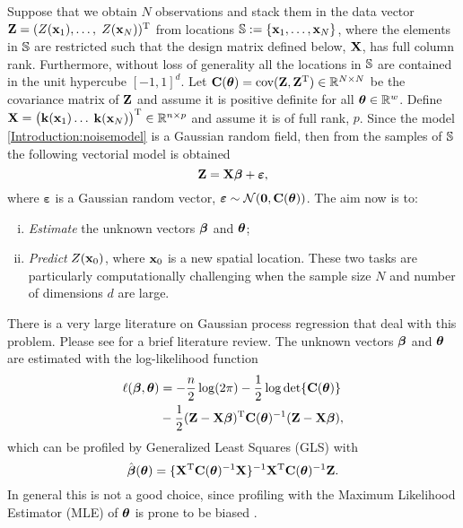 \documentclass[11pt,final]{amsart}       %
\begin{document}
Suppose that we obtain $N$ observations and stack them in the data
vector $\mathbf{Z}=(Z(\mathbf{x}_1),\ldots,$ $Z(\mathbf{x}_N))^{\rm T}$ from locations $\mathbb{S} :=\{
\mathbf{x}_{1},\dots,\mathbf{x}_{N}\}$, where the elements in $\mathbb{S}$ are restricted
such that the design matrix defined below, $\mathbf{X}$, has full column
rank.  Furthermore, without loss of generality all the locations in
$\mathbb{S}$ are contained in the unit hypercube $[-1,1]^{d}$.  Let
$\mathbf{C}(\boldsymbol{\theta})=\hbox{cov}(\mathbf{Z},\mathbf{Z}^{\rm T})\in \Bbb{R}^{N \times N}$ be the covariance
matrix of $\mathbf{Z}$ and assume it is positive definite for all
$\boldsymbol{\theta}\in\Bbb{R}^w$.  Define $\mathbf{X}=\big( \mathbf{k}(\mathbf{x}_1) \ldots$ $
\mathbf{k}(\mathbf{x}_N)\big)^{\rm T}\in \Bbb{R}^{n\times p}$ and assume it is of full rank,
$p$. Since the model \eqref{Introduction:noisemodel} is a Gaussian
random field, then from the samples of $\mathbb{S}$ the following vectorial
model is obtained
\begin{equation}
{\bf Z} = \mathbf{X} \boldsymbol{\beta} +{\boldsymbol \varepsilon},
\label{Introduction:vectormodel}
\end{equation}
where $\boldsymbol \varepsilon$ is a Gaussian random vector,
${\boldsymbol \varepsilon} \sim {\mathcal N}(\mathbf{0},\mathbf{C}(\boldsymbol{\theta}))$. The aim
now is to:

\begin{enumerate}[i)]
\item {\it Estimate} the unknown vectors $\boldsymbol{\beta}$ and $\boldsymbol{\theta}$;

\item {\it Predict} $Z(\mathbf{x}_0)$, where $\mathbf{x}_0$ is a new spatial
  location. These two tasks are particularly computationally
  challenging when the sample size $N$ and number of dimensions $d$
  are large.
\end{enumerate}

There is a very large literature on Gaussian process regression that
deal with this problem. Please see \cite{Castrillon2015} for a brief
literature review.  The unknown vectors $\boldsymbol{\beta}$ and $\boldsymbol{\theta}$ are
estimated with the log-likelihood function
\begin{equation}
  \begin{split}
\ell(\boldsymbol{\beta},\boldsymbol{\theta})&=-\frac{n}{2}\log(2\pi)-\frac{1}{2}\log
\det\{\mathbf{C}(\boldsymbol{\theta})\} \\ &
-\frac{1}{2}(\mathbf{Z}-\mathbf{X}\boldsymbol{\beta})^{\rm T}\mathbf{C}(\boldsymbol{\theta})^{-1}
(\mathbf{Z}-\mathbf{X}\boldsymbol{\beta}),
\end{split}
\label{Introduction:loglikelihood}
\end{equation}
which can be profiled by Generalized Least Squares (GLS) with
\begin{equation}
  \hat {\boldsymbol{\beta}}(\boldsymbol{\theta})=\{\mathbf{X}^{\rm T} \mathbf{C}(\boldsymbol{\theta})^{-1} \mathbf{X}\}^{-1}\mathbf{X}^{\rm T}
  \mathbf{C}(\boldsymbol{\theta})^{-1}\mathbf{Z}.
  \label{GLSbeta}
\end{equation}
In general this is not a good choice, since profiling with the Maximum
Likelihood Estimator (MLE) of $\boldsymbol{\theta}$ is prone to be biased
\cite{Castrillon2015}.
\end{document}
